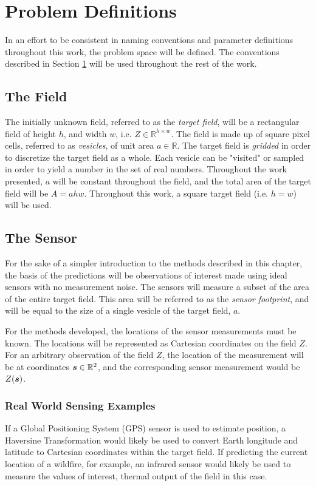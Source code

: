 \chapter{Problem Definitions} \label{ch:defs}
In an effort to be consistent in naming conventions and parameter definitions throughout this work, the problem space will be defined. The conventions described in Section \ref{ch:defs} will be used throughout the rest of the work.

\section{The Field}
The initially unknown field, referred to as the \textit{target field}, will be a rectangular field of height $h$, and width $w$, i.e. $Z \in \mathbb{R}^{h \times w}$. The field is made up of square pixel cells, referred to as \textit{vesicles}, of unit area $a \in \mathbb{R}$. The target field is \textit{gridded} in order to discretize the target field as a whole. Each vesicle can be "visited" or sampled in order to yield a number in the set of real numbers. Throughout the work presented, $a$ will be constant throughout the field, and the total area of the target field will be $A = ahw$. Throughout this work, a square target field (i.e. $h = w$) will be used.

\section{The Sensor} \label{sec:sensor_measurements}
For the sake of a simpler introduction to the methods described in this chapter, the basis of the predictions will be observations of interest made using ideal sensors with no measurement noise. The sensors will measure a subset of the area of the entire target field. This area will be referred to as the \textit{sensor footprint}, and will be equal to the size of a single vesicle of the target field, $a$.

For the methods developed, the locations of the sensor measurements must be known. The locations will be represented as Cartesian coordinates on the field $Z$. For an arbitrary observation of the field $Z$, the location of the measurement will be at coordinates ${\it{\boldsymbol{s}}} \in \mathbb{R}^2$, and the corresponding sensor measurement would be $Z({\it{\boldsymbol{s}}})$.

\subsection{Real World Sensing Examples}
If a Global Positioning System (GPS) sensor is used to estimate position, a Haversine Transformation would likely be used to convert Earth longitude and latitude to Cartesian coordinates within the target field. If predicting the current location of a wildfire, for example, an infrared sensor would likely be used to measure the values of interest, thermal output of the field in this case.

